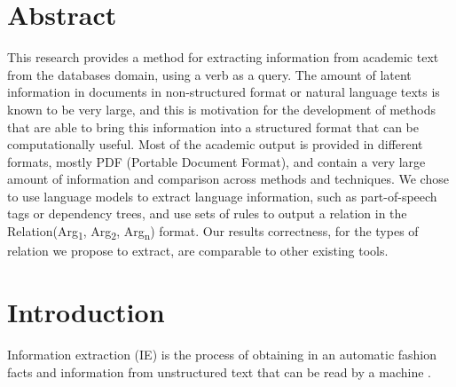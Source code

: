 \documentclass[11pt,a4paper,openright]{memoir}
\title{\theTitle}
\author{\theAuthor}
\begin{document}
\setlength\parindent{24pt}
\captionnamefont{\bfseries}

\frontmatter

\makeunswfrontmatter

\newpage
\thispagestyle{empty}
\strut
\vfill


\chapter*{Abstract}

This research provides a method for extracting information from academic text from the databases domain, using a verb as a query. The amount of latent information in documents in non-structured format or natural language  texts is known to be very large, and this is motivation for the development of methods that are able to bring this information into a structured format that can be computationally useful. Most of the academic output is provided in different formats, mostly PDF (Portable Document Format), and contain a very large amount of information and comparison across methods and techniques. We chose to use language models to extract language information, such as part-of-speech tags or dependency trees, and use sets of rules to output a relation in the Relation(Arg\textsubscript{1}, Arg\textsubscript{2}, Arg\textsubscript{n}) format. Our results correctness, for the types of relation we propose to extract, are comparable to other existing tools.

\clearpage
\tableofcontents

\cleardoublepage

\mainmatter


%
%
%
%


\chapter{Introduction}
Information extraction (IE) is the process of obtaining in an automatic fashion facts and information from unstructured text that can be read by a machine \cite{Jurafsky:2000:SLP:555733}.
\end{document}
